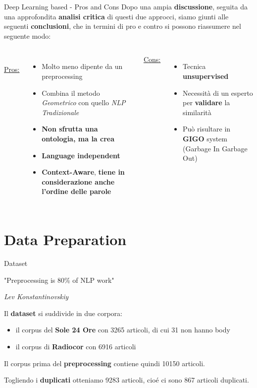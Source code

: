\documentclass[british]{beamer}
\begin{document}
\begin{frame}{Deep Learning based - Pros and Cons}
	Dopo una ampia \textbf{discussione}, seguita da una approfondita \textbf{analisi critica} di questi due approcci, siamo giunti alle seguenti \textbf{conclusioni}, che in termini di pro e contro si possono riassumere nel seguente modo:
	\begin{columns}
		\\
		\underline{Pros:}
		\begin{itemize}
			\item Molto meno dipente da un preprocessing
			\item Combina il metodo \textit{Geometrico} con quello \textit{NLP Tradizionale}
			\item \textbf{Non sfrutta una ontologia, ma la \alert{crea}} 
			\item \textbf{\alert{Language independent}}
			\item \textbf{\alert{Context-Aware}}, \textbf{tiene in considerazione anche l'ordine delle parole}
		\end{itemize}
		\underline{Cons:}
		\begin{itemize}
			\item Tecnica \textbf{unsupervised}
			\item Necessit\`{a} di un esperto per \textbf{validare} la similarit\`{a}
			\item Pu\`{o} risultare in \textbf{GIGO} system (Garbage In Garbage Out)
		\end{itemize}
	\end{columns}
\end{frame}
	
\section{Data Preparation}

\begin{frame}{Dataset}
	\begin{displayquote}
		"Preprocessing is 80\% of NLP work"
		 
		\begin{flushright}
			\textit{Lev Konstantinovskiy}
		\end{flushright}
	\end{displayquote}
	Il \textbf{dataset} si suddivide in due corpora: 
	\begin{itemize}
		\item il corpus del \textbf{Sole 24 Ore} con 3265 articoli, di cui 31 non hanno body
		\item il corpus di \textbf{Radiocor} con 6916 articoli
	\end{itemize}
	Il corpus prima del \textbf{preprocessing} contiene quindi 10150 articoli. \par
	Togliendo i \textbf{duplicati} otteniamo 9283 articoli, cio\'{e} ci sono 867 articoli duplicati.
\end{frame}
\end{document}
